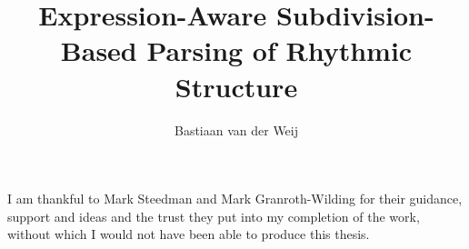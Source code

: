 \documentclass[logo,msc,cogsci]{infthesis/infthesis}
\title{Expression-Aware Subdivision-Based Parsing of Rhythmic Structure}
\author{Bastiaan van der Weij}
\begin{document}
\begin{preliminary}
\maketitle
\begin{acknowledgements}

I am thankful to Mark Steedman and Mark Granroth-Wilding for their guidance, support and ideas and the trust they put into my completion of the work, without which I would not have been able to produce this thesis.

\end{acknowledgements}

\standarddeclaration


\tableofcontents


\end{preliminary}



%
%






\appendix




\end{document}
